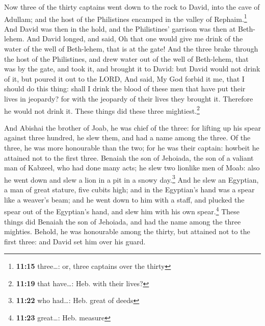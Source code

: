  Now three of the thirty captains went down to the rock
to David, into the cave of Adullam; and the host of the Philistines
encamped in the valley of Rephaim.\footnote{\textbf{11:15} three\ldots:
  or, three captains over the thirty}  And David was then
in the hold, and the Philistines' garrison was then at Beth-lehem.
 And David longed, and said, Oh that one would give me
drink of the water of the well of Beth-lehem, that is at the gate!
 And the three brake through the host of the Philistines,
and drew water out of the well of Beth-lehem, that was by the gate, and
took it, and brought it to David: but David would not drink of it, but
poured it out to the LORD,  And said, My God forbid it
me, that I should do this thing: shall I drink the blood of these men
that have put their lives in jeopardy? for with the jeopardy of their
lives they brought it. Therefore he would not drink it. These things did
these three mightiest.\footnote{\textbf{11:19} that have\ldots: Heb.
  with their lives?}

 And Abishai the brother of Joab, he was chief of the
three: for lifting up his spear against three hundred, he slew them, and
had a name among the three.  Of the three, he was more
honourable than the two; for he was their captain: howbeit he attained
not to the first three.  Benaiah the son of Jehoiada, the
son of a valiant man of Kabzeel, who had done many acts; he slew two
lionlike men of Moab: also he went down and slew a lion in a pit in a
snowy day.\footnote{\textbf{11:22} who had\ldots: Heb. great of deeds}
 And he slew an Egyptian, a man of great stature, five
cubits high; and in the Egyptian's hand was a spear like a weaver's
beam; and he went down to him with a staff, and plucked the spear out of
the Egyptian's hand, and slew him with his own spear.\footnote{\textbf{11:23}
  great\ldots: Heb. measure}  These things did Benaiah
the son of Jehoiada, and had the name among the three mighties.
 Behold, he was honourable among the thirty, but attained
not to the first three: and David set him over his guard.

